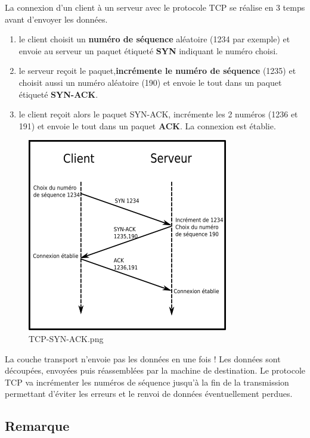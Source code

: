 \documentclass[11pt]{article}
\providecommand{\tightlist}{%
      \setlength{\itemsep}{0pt}\setlength{\parskip}{0pt}}
\begin{document}
La connexion d'un client à un serveur avec le protocole TCP se réalise
en 3 temps avant d'envoyer les données.

\begin{enumerate}
\def\labelenumi{\arabic{enumi}.}
\tightlist
\item
  le client choisit un \textbf{numéro de séquence} aléatoire (1234 par
  exemple) et envoie au serveur un paquet étiqueté \textbf{SYN}
  indiquant le numéro choisi.
\item
  le serveur reçoit le paquet,\textbf{incrémente le numéro de séquence}
  (1235) et choisit aussi un numéro aléatoire (190) et envoie le tout
  dans un paquet étiqueté \textbf{SYN-ACK}.
\item
  le client reçoit alors le paquet SYN-ACK, incrémente les 2 numéros
  (1236 et 191) et envoie le tout dans un paquet \textbf{ACK}. La
  connexion est établie.
\end{enumerate}

    \begin{figure}
\centering
\includegraphics{img/TCP-SYN-ACK.png}
\caption{TCP-SYN-ACK.png}
\end{figure}

    La couche transport n'envoie pas les données en une fois ! Les données
sont découpées, envoyées puis réassemblées par la machine de
destination. Le protocole TCP va incrémenter les numéros de séquence
jusqu'à la fin de la transmission permettant d'éviter les erreurs et le
renvoi de données éventuellement perdues.

\hypertarget{remarque}{%
\subsection{Remarque}\label{remarque}}
\end{document}
